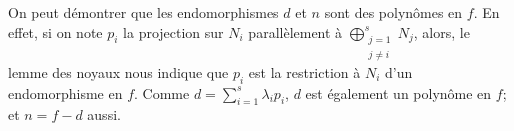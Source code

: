   \begin{remark}
    On peut démontrer que les endomorphismes $d$ et $n$ sont des polynômes en $f$. En effet, si on note $p_i$ la projection sur $N_i$ parallèlement à $\bigoplus_{\substack{j=1 \\ j \neq i}}^s N_j$, alors, le lemme des noyaux nous indique que $p_i$ est la restriction à $N_i$ d'un endomorphisme en $f$. Comme $d = \sum_{i=1}^s \lambda_i p_i$, $d$ est également un polynôme en $f$; et $n = f-d$ aussi.
  \end{remark}

